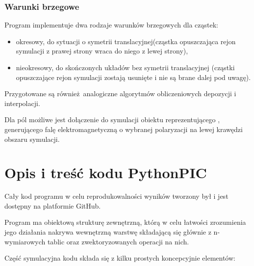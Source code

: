 


\subsubsection{Warunki brzegowe}
Program implementuje dwa rodzaje warunków brzegowych dla cząstek:
\begin{itemize}
\item okresowy, do sytuacji o symetrii translacyjnej(cząstka opuszczająca rejon symulacji z prawej strony wraca do niego z lewej strony),
\item nieokresowy, do skończonych układów bez symetrii translacyjnej (cząstki opuszczające rejon symulacji zostają usunięte i nie są brane
dalej pod uwagę).
\end{itemize}

Przygotowane są również analogiczne  
algorytmów obliczeniowych depozycji i interpolacji.

Dla pól możliwe jest dołączenie do symulacji obiektu reprezentującego ,
generującego falę elektromagnetyczną o wybranej polaryzacji na lewej krawędzi obszaru symulacji.

\section{Opis i treść kodu PythonPIC}
Cały kod programu w celu reprodukowalności wyników tworzony był i jest
dostępny na platformie GitHub\cite{github-repo}.

Program ma obiektową strukturę zewnętrzną, którą w celu łatwości
zrozumienia jego działania nakrywa wewnętrzną warstwę składającą się
głównie z n-wymiarowych tablic  oraz zwektoryzowanych
operacji na nich.

Część symulacyjna kodu składa się z kilku prostych koncepcyjnie elementów:

